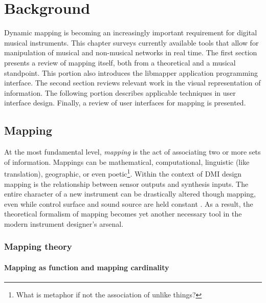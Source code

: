 \chapter{Background}

Dynamic mapping is becoming an increasingly important requirement for digital musical instruments. This chapter surveys currently available tools that allow for manipulation of musical and non-musical networks in real time. The first section presents a review of mapping itself, both from a theoretical and a musical standpoint. This portion also introduces the libmapper application programming interface. The second section reviews relevant work in the visual representation of information. The following portion describes applicable techniques in user interface design. Finally, a review of user interfaces for mapping is presented.

\section{Mapping}

At the most fundamental level, \emph{mapping} is the act of associating two or more sets of information. Mappings can be mathematical, computational, linguistic (like translation), geographic, or even poetic\footnote{What is metaphor if not the association of unlike things?}. Within the context of DMI design mapping is the relationship between sensor outputs and synthesis inputs. The entire character of a new instrument can be drastically altered though mapping, even while control surface and sound source are held constant . As a result, the theoretical formalism of mapping becomes yet another necessary tool in the modern instrument designer's arsenal.

\subsection{Mapping theory}
	\label{sec:mapping_theory}

	\subsubsection{Mapping as function and mapping cardinality}

